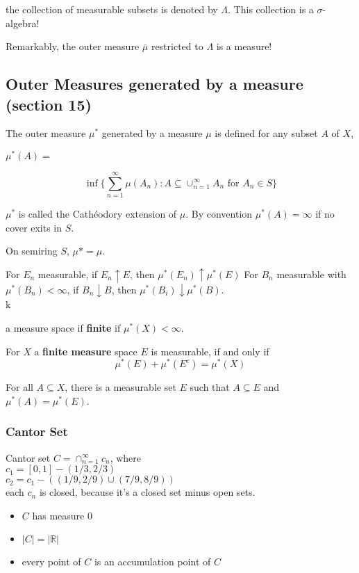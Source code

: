 \documentclass[a4paper, 12pt]{article}
\def\R{\ensuremath{\mathbb{R}}} %
\newcommand{\bt}[1]{\textbf{#1}} %
\begin{document}
\begin{multicols}{2}
the collection of measurable subsets is denoted by $\Lambda$.
This collection is a $\sigma$-algebra! 

Remarkably, the outer measure $\bar \mu$ restricted to $\Lambda$ is a measure!


\subsection{Outer Measures generated by a measure (section 15)}
The outer measure $\mu^*$ generated by a measure $\mu$ is defined for any subset $A$ of $X$, 
\centerline{$\mu^*(A) =$}
$$\inf\{\sum_{n=1}^\infty \mu(A_n) : A \subseteq \cup_{n=1}^\infty A_n 
\text{ for $A_n \in S$}\}$$

$\mu^*$ is called the Cath\'eodory extension of $\mu$.
By convention $\mu^*(A) = \infty$ if no cover exits in $S$.

On semiring $S$, $\mu* = \mu$.


For $E_n$ measurable, if $E_n \uparrow E$, then $\mu^*(E_n) \uparrow \mu^*(E)$
For $B_n$ measurable with $\mu^*(B_n) < \infty$, if $B_n \downarrow B$, then
$\mu^*(B_i) \downarrow \mu^*(B)$. \\k

a measure space if \bt{finite} if $\mu^*(X) < \infty$.


For $X$ a \bt{finite measure} space $E$ is measurable, if and only if 
$$\mu^*(E) + \mu^*(E^c) = \mu^*(X)$$

For all $A \subseteq X$, there is a measurable set $E$ such that 
$A \subseteq E$ and $\mu^*(A) = \mu^*(E)$.


\subsubsection{Cantor Set}
Cantor set $C = \cap_{n=1}^\infty c_n$, where \\
$c_1 = [0, 1] - (1/3, 2/3) $\\
$c_2 = c_1 - ((1/9, 2/9) \cup (7/9, 8/9))$ \\

each $c_n$ is closed, because it's a closed set minus open sets.

\begin{itemize}
    \item $C$ has measure 0
    \item $|C| = |\R|$
    \item every point of $C$ is an accumulation point of $C$
\end{itemize}


\end{multicols}
\end{document}
